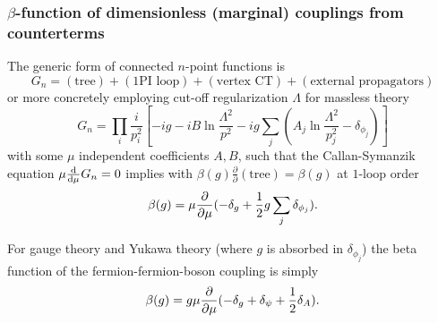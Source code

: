 \subsubsection{$\beta$-function of dimensionless (marginal) couplings from counterterms}
\begin{mybox}{}
	The generic form of connected $n$-point functions is
	\begin{equation}
	G_n = (\text{tree}) + (1\text{PI loop}) + (\text{vertex CT}) + ( \text{external propagators})
	\end{equation}
	or more concretely employing cut-off regularization $\Lambda$ for massless theory
	\begin{equation}
	G_n = \prod_i \frac{i}{p^2_i} \left[-i g - i B \ln \frac{\Lambda^2}{p^2} - ig \sum_j\left(A_j \ln \frac{\Lambda^2}{p^2_j} -\delta_{\phi_j}\right)\right]
	\end{equation}
	with some $\mu$ independent coefficients $A,B$, such that the Callan-Symanzik equation $\mu \frac{\mathrm{d}}{\mathrm{d} \mu}G_n=0$ implies with $\beta(g) \frac{\partial}{\partial}(\text{tree}) = \beta(g)$ at $1$-loop order
	\begin{equation}
		\beta(g) = \mu \frac{\partial}{\partial \mu} (-\delta_g + \frac{1}{2} g \sum_j \delta_{\phi_j}).
	\end{equation}
	
\end{mybox}
For gauge theory and Yukawa theory (where $g$ is absorbed in $\delta_{\phi_j}$) the beta function of the fermion-fermion-boson coupling is simply
\begin{equation}
	\beta(g) = g \mu \frac{\partial}{\partial \mu} (-\delta_g+\delta_\psi + \frac{1}{2} \delta_A).
\end{equation}


